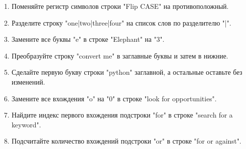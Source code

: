 \documentclass[a4,12pt]{article}
\theoremstyle{remark}
\begin{document}
\begin{enumerate}
    \item Поменяйте регистр символов строки "Flip CASE" на противоположный.
    \item Разделите строку "one|two|three|four" на список слов по разделителю "|".
    \item Замените все буквы "e" в строке "Elephant" на "3".
    \item Преобразуйте строку "convert me" в заглавные буквы и затем в нижние.
    \item Сделайте первую букву строки "python" заглавной, а остальные оставьте без изменений.
    \item Замените все вхождения "o" на "0" в строке "look for opportunities".
    \item Найдите индекс первого вхождения подстроки "for" в строке "search for a keyword".
    \item Подсчитайте количество вхождений подстроки "or" в строке "for or against".
\end{enumerate}
\end{document}
